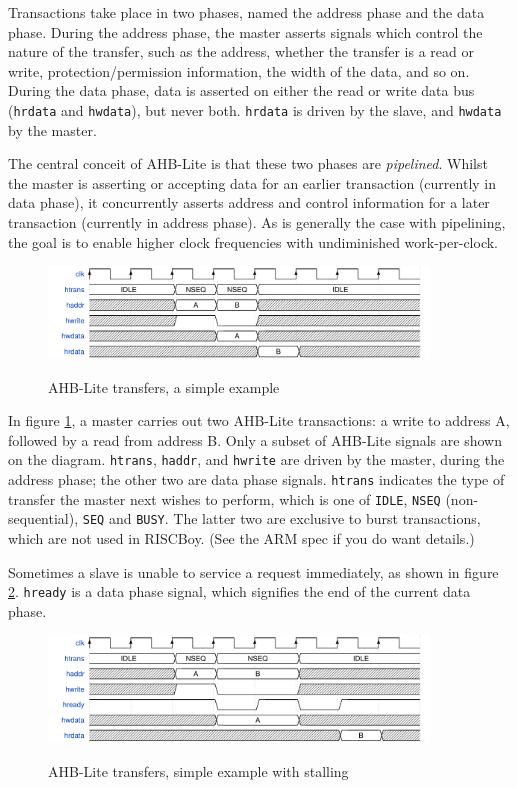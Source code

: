 \documentclass[notitlepage]{article}
\begin{document}
Transactions take place in two phases, named the address phase and the data phase. During the address phase, the master asserts signals which control the nature of the transfer, such as the address, whether the transfer is a read or write, protection/permission information, the width of the data, and so on. During the data phase, data is asserted on either the read or write data bus (\texttt{hrdata} and \texttt{hwdata}), but never both. \texttt{hrdata} is driven by the slave, and \texttt{hwdata} by the master.

The central conceit of AHB-Lite is that these two phases are \textit{pipelined}. Whilst the master is asserting or accepting data for an earlier transaction (currently in data phase), it concurrently asserts address and control information for a later transaction (currently in address phase). As is generally the case with pipelining, the goal is to enable higher clock frequencies with undiminished work-per-clock.

\begin{figure}[H]
\centering
\caption{AHB-Lite transfers, a simple example}
\includegraphics[width=0.9\textwidth]{waves/ahbl_basic.pdf}
\label{diagram:ahbl_basic}
\end{figure}

In figure \ref{diagram:ahbl_basic}, a master carries out two AHB-Lite transactions: a write to address A, followed by a read from address B. Only a subset of AHB-Lite signals are shown on the diagram. \texttt{htrans}, \texttt{haddr}, and \texttt{hwrite} are driven by the master, during the address phase; the other two are data phase signals. \texttt{htrans} indicates the type of transfer the master next wishes to perform, which is one of \texttt{IDLE}, \texttt{NSEQ} (non-sequential), \texttt{SEQ} and \texttt{BUSY}. The latter two are exclusive to burst transactions, which are not used in RISCBoy. (See the ARM spec if you do want details.)

Sometimes a slave is unable to service a request immediately, as shown in figure \ref{diagram:ahbl_basic_stall}. \texttt{hready} is a data phase signal, which signifies the end of the current data phase.

\begin{figure}[H]
\centering
\caption{AHB-Lite transfers, simple example with stalling}
\includegraphics[width=0.9\textwidth]{waves/ahbl_basic_stall.pdf}
\label{diagram:ahbl_basic_stall}
\end{figure}
\end{document}
